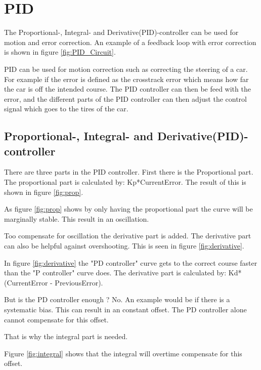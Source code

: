 \chapter{PID}
\label{chp:pid}
The Proportional-, Integral- and Derivative(PID)-controller can be used for motion and error correction. An example of a feedback loop with error correction is shown in figure \ref{fig:PID_Circuit}. 
 

PID can be used for motion correction such as correcting the steering of a car. For example if the error is defined as the crosstrack error which means how far the car is off the intended course. The PID controller can then be feed with the error, and the different parts of the PID controller can then adjust the control signal which goes to the tires of the car. 


\section{Proportional-, Integral- and Derivative(PID)-controller}
There are three parts in the PID controller. First there is the Proportional part.
The proportional part is calculated by: Kp*CurrentError. The result of this is shown in figure \ref{fig:prop}.

As figure \ref{fig:prop} shows by only having the proportional part the curve will be marginally stable. This result in an oscillation.

Too compensate for oscillation the derivative part is added. The derivative part can also be helpful against overshooting. This is seen in figure \ref{fig:derivative}.


In figure \ref{fig:derivative} the "PD controller" curve gets to the correct course faster than the "P controller" curve does. The derivative part is calculated by: Kd*(CurrentError - PreviousError).

But is the PD controller enough ? No. An example would be if there is a systematic bias. This can result in an constant offset. The PD controller alone cannot compensate for this offset. 

That is why the integral part is needed. 

Figure \ref{fig:integral} shows that the integral will overtime compensate for this offset. 


